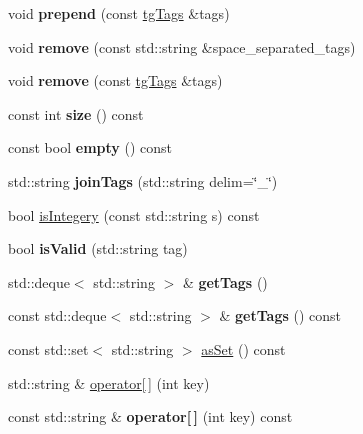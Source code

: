 \begin{DoxyCompactItemize}
\item 
\hypertarget{classtg_tags_aff6e40cac53b95d30f89092eec2239b7}{void {\bfseries prepend} (const \hyperlink{classtg_tags}{tg\-Tags} \&tags)}\label{classtg_tags_aff6e40cac53b95d30f89092eec2239b7}

\item 
\hypertarget{classtg_tags_a96977a79c625108cb8755d395f22b3b8}{void {\bfseries remove} (const std\-::string \&space\-\_\-separated\-\_\-tags)}\label{classtg_tags_a96977a79c625108cb8755d395f22b3b8}

\item 
\hypertarget{classtg_tags_af3bfa003a839a1eaca7dd8000e59baea}{void {\bfseries remove} (const \hyperlink{classtg_tags}{tg\-Tags} \&tags)}\label{classtg_tags_af3bfa003a839a1eaca7dd8000e59baea}

\item 
\hypertarget{classtg_tags_aee6d4cd6c61dca0caa4e6e1d78f605e2}{const int {\bfseries size} () const }\label{classtg_tags_aee6d4cd6c61dca0caa4e6e1d78f605e2}

\item 
\hypertarget{classtg_tags_a1a95f72900f47afc8038c5e61f798e2e}{const bool {\bfseries empty} () const }\label{classtg_tags_a1a95f72900f47afc8038c5e61f798e2e}

\item 
\hypertarget{classtg_tags_aafbf381269542736a4fc1ce5b4305cf9}{std\-::string {\bfseries join\-Tags} (std\-::string delim=\char`\"{}\-\_\-\char`\"{})}\label{classtg_tags_aafbf381269542736a4fc1ce5b4305cf9}

\item 
bool \hyperlink{classtg_tags_a82448e7c6c115ef3267e6313594f756b}{is\-Integery} (const std\-::string s) const 
\item 
\hypertarget{classtg_tags_a7d70692be4416a6851c9b3aefca362e7}{bool {\bfseries is\-Valid} (std\-::string tag)}\label{classtg_tags_a7d70692be4416a6851c9b3aefca362e7}

\item 
\hypertarget{classtg_tags_ac28b0de13a8a5a582461b86fd83cc26a}{std\-::deque$<$ std\-::string $>$ \& {\bfseries get\-Tags} ()}\label{classtg_tags_ac28b0de13a8a5a582461b86fd83cc26a}

\item 
\hypertarget{classtg_tags_aa4cd2f735259d4be257d7324f52f98d5}{const std\-::deque$<$ std\-::string $>$ \& {\bfseries get\-Tags} () const }\label{classtg_tags_aa4cd2f735259d4be257d7324f52f98d5}

\item 
const std\-::set$<$ std\-::string $>$ \hyperlink{classtg_tags_abf3f3d4aad3392b7eb7a8bac6685f327}{as\-Set} () const 
\item 
std\-::string \& \hyperlink{classtg_tags_aa611d2471ea748b49bdc699ad29302e9}{operator\mbox{[}$\,$\mbox{]}} (int key)
\item 
\hypertarget{classtg_tags_a0c55f23cb7c0473eca8834500bcb36a0}{const std\-::string \& {\bfseries operator\mbox{[}$\,$\mbox{]}} (int key) const }\label{classtg_tags_a0c55f23cb7c0473eca8834500bcb36a0}


\end{DoxyCompactItemize}
